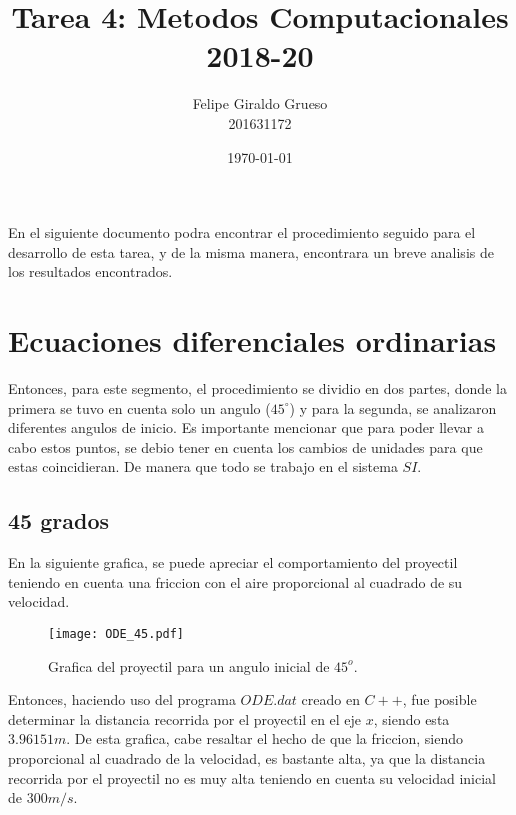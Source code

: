 \documentclass[11pt]{article}
\begin{document}
\title{Tarea 4: Metodos Computacionales \\ 2018-20}%

\author{Felipe Giraldo Grueso \\ 201631172}

\date{\today}

\maketitle

En el siguiente documento podra encontrar el procedimiento seguido para el desarrollo de esta tarea, y de la misma manera, encontrara un breve analisis de los resultados encontrados.

\section{Ecuaciones diferenciales ordinarias}

Entonces, para este segmento, el procedimiento se dividio en dos partes, donde la primera se tuvo en cuenta solo un angulo ($45^\circ$) y para la segunda, se analizaron diferentes angulos de inicio. Es importante mencionar que para poder llevar a cabo estos puntos, se debio tener en cuenta los cambios de unidades para que estas coincidieran. De manera que todo se trabajo en el sistema $SI$.
	\subsection{45 grados}

		En la siguiente grafica, se puede apreciar el comportamiento del proyectil teniendo en cuenta una friccion con el aire proporcional al cuadrado de su velocidad.
		\begin{figure}[H]
    			\begin{center}
    				\texttt{[image: ODE\_45.pdf]}
    				\caption{Grafica del proyectil para un angulo inicial de $45^o$.}
			\end{center}
    			\label{fig:45}
		\end{figure}

		Entonces, haciendo uso del programa $ODE.dat$ creado en $C++$, fue posible determinar la distancia recorrida por el proyectil en el eje $x$, siendo esta $3.96151 m$. De esta grafica, 			cabe resaltar el hecho de que la friccion, siendo proporcional al cuadrado de la velocidad, es bastante alta, ya que la distancia recorrida por el proyectil no es muy alta teniendo en 		cuenta su velocidad inicial de $300 m/s$.
\end{document}
